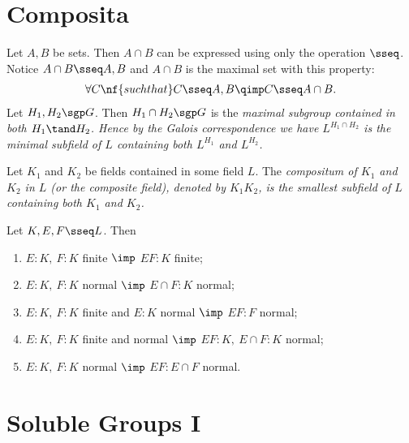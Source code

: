 \documentclass{article}
\begin{document}

\section{Composita}
\begin{tremark}
  Let \( A,B \) be sets. Then \( A\cap B \) can be expressed using only the operation \( \sseq \).
  Notice \( A\cap B \sseq A,B \) and \( A\cap B \) is the maximal set with this property: \begin{align*}
    \forall C \nf{ such that } C\sseq A,B \qimp C\sseq A\cap B.
  \end{align*}
  Let \( H_1,H_2\sgp G \).
  Then \( H_1\cap H_2 \sgp G \) is the \it{maximal} subgroup contained in both \( H_1 \tand H_2 \).
  Hence by the Galois correspondence we have \( L^{H_1\cap H_2} \) is the \it{minimal} subfield of \( L \) containing both \( L^{H_1} \) and \( L^{H_2} \).
\end{tremark}

\begin{tdefinition}[Compositum]
  Let \( K_1 \) and \( K_2 \) be fields contained in some field \( L \).
  The \it{compositum} of \( K_1 \) and \( K_2 \) in \( L \) (or the \it{composite field}), denoted by \( K_1K_2 \), is the smallest subfield of \( L \) containing both \( K_1 \) and \( K_2 \).
\end{tdefinition}

\begin{tlemma}
  Let \( K,E,F \sseq L \).
  Then \begin{enumerate}
    \item \( E:K,\ F:K \) finite \( \imp \) \( EF:K \) finite;
    \item \( E:K,\ F:K \) normal \( \imp \) \( E\cap F:K \) normal;
    \item \( E:K,\ F:K \) finite and \( E:K \) normal \( \imp \) \( EF:F \) normal;
    \item \( E:K,\ F:K \) finite and normal \( \imp \) \( EF:K,\ E\cap F:K \) normal;
    \item \( E:K,\ F:K \) normal \( \imp \) \( EF:E\cap F \) normal.
  \end{enumerate}
\end{tlemma}
\section{Soluble Groups I}
\end{document}

